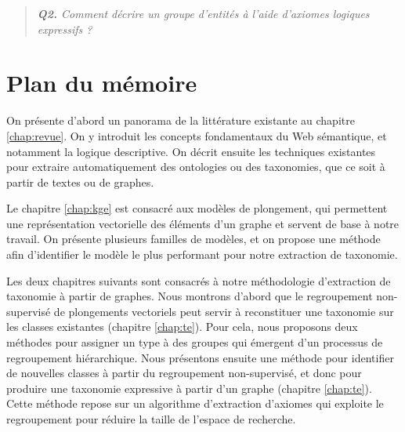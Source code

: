 \begin{quote}
    \emph{\textbf{Q2.} Comment décrire un groupe d'entités à l'aide d'axiomes logiques expressifs ?}
\end{quote}



\section{Plan du mémoire}  %



On présente d'abord un panorama de la littérature existante au chapitre \ref{chap:revue}. On y introduit les concepts fondamentaux du Web sémantique, et notamment la logique descriptive. On décrit ensuite les techniques existantes pour extraire automatiquement des ontologies ou des taxonomies, que ce soit à partir de textes ou de graphes.

Le chapitre \ref{chap:kge} est consacré aux modèles de plongement, qui permettent une représentation vectorielle des éléments d'un graphe et servent de base à notre travail. On présente plusieurs familles de modèles, et on propose une méthode afin d'identifier le modèle le plus performant pour notre extraction de taxonomie. %





Les deux chapitres suivants sont consacrés à notre méthodologie d'extraction de taxonomie à partir de graphes. Nous montrons d'abord que le regroupement non-supervisé de plongements vectoriels peut servir à reconstituer une taxonomie sur les classes existantes (chapitre \ref{chap:te}). Pour cela, nous proposons deux méthodes pour assigner un type à des groupes qui émergent d'un processus de regroupement hiérarchique. 
Nous présentons ensuite une méthode pour identifier de nouvelles classes à partir du regroupement non-supervisé, et donc pour produire une taxonomie expressive à partir d'un graphe (chapitre \ref{chap:te}). Cette méthode repose sur un algorithme d'extraction d'axiomes qui exploite le regroupement pour réduire la taille de l'espace de recherche.

